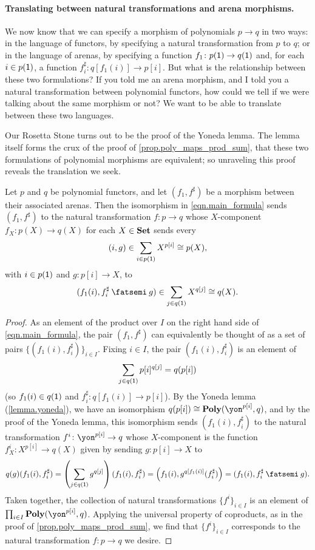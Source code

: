 \documentclass[Book-Poly]{subfiles}
\begin{document}


\paragraph{Translating between natural transformations and arena morphisms.}
We now know that we can specify a morphism of polynomials $p \to q$ in two ways: in the language of functors, by specifying a natural transformation from $p$ to $q$; or in the language of arenas, by specifying a function $f_1 \colon p(\textsf{1}) \to q(\textsf{1})$ and, for each $i \in p(\textsf{1})$, a function $f^\sharp_i \colon q[f_1(i)] \to p[i]$.
But what is the relationship between these two formulations?
If you told me an arena morphism, and I told you a natural transformation between polynomial functors, how could we tell if we were talking about the same morphism or not?
We want to be able to translate between these two languages.

Our Rosetta Stone turns out to be the proof of the Yoneda lemma.
The lemma itself forms the crux of the proof of \cref{prop.poly_maps_prod_sum}, that these two formulations of polynomial morphisms are equivalent; so unraveling this proof reveals the translation we seek.

\begin{proposition} \label{prop.morph_arena_to_func}
Let $p$ and $q$ be polynomial functors, and let $(f_1, f^\sharp)$ be a morphism between their associated arenas.
Then the isomorphism in \eqref{eqn.main_formula} sends $(f_1, f^\sharp)$ to the natural transformation $f \colon p \to q$ whose $X$-component $f_X \colon p(X) \to q(X)$ for each $X \in \mathbf{Set}$ sends every
\[
    (i, g) \in \sum_{i \in p(\textsf{1})} X^{p[i]} \cong p(X),
\]
with $i \in p(\textsf{1})$ and $g \colon p[i] \to X$, to
\[
    (f_1(i), f^\sharp_i \then g) \in \sum_{j \in q(\1)} X^{q[j]} \iso q(X).
\]
\end{proposition}
\begin{proof}
As an element of the product over $I$ on the right hand side of \eqref{eqn.main_formula}, the pair $(f_1, f^\sharp)$ can equivalently be thought of as a set of pairs $\{(f_1(i), f^\sharp_i)\}_{i \in I}$.
Fixing $i \in I$, the pair $(f_1(i), f^\sharp_i)$ is an element of
\[
    \sum_{j \in q(\textsf{1})} p[i]^{q[j]} = q(p[i])
\]
(so $f_1(i) \in q(\textsf{1})$ and $f^\sharp_i \colon q[f_1(i)] \to p[i]$).
By the Yoneda lemma (\cref{lemma.yoneda}), we have an isomorphism $q(p[i]) \iso \poly(\yon^{p[i]}, q)$, and by the proof of the Yoneda lemma, this isomorphism sends $(f_1(i), f^\sharp_i)$ to the natural transformation $f^i \colon \yon^{p[i]} \to q$ whose $X$-component is the function $f^i_X \colon X^{p[i]} \to q(X)$ given by sending $g \colon p[i] \to X$ to
\[
    q(g)(f_1(i), f^\sharp_i) = \left(\sum_{j \in q(\1)} g^{q[j]}\right)(f_1(i), f^\sharp_i) = \left(f_1(i), g^{q[f_1(i)]}(f^\sharp_i)\right) = (f_1(i), f^\sharp_i \then g).
\]
Taken together, the collection of natural transformations $\{f^i\}_{i \in I}$ is an element of $\prod_{i \in I} \poly(\yon^{p[i]}, q)$.
Applying the universal property of coproducts, as in the proof of \cref{prop.poly_maps_prod_sum}, we find that $\{f^i\}_{i \in I}$ corresponds to the natural transformation $f \colon p \to q$ we desire.
\end{proof}
\end{document}
